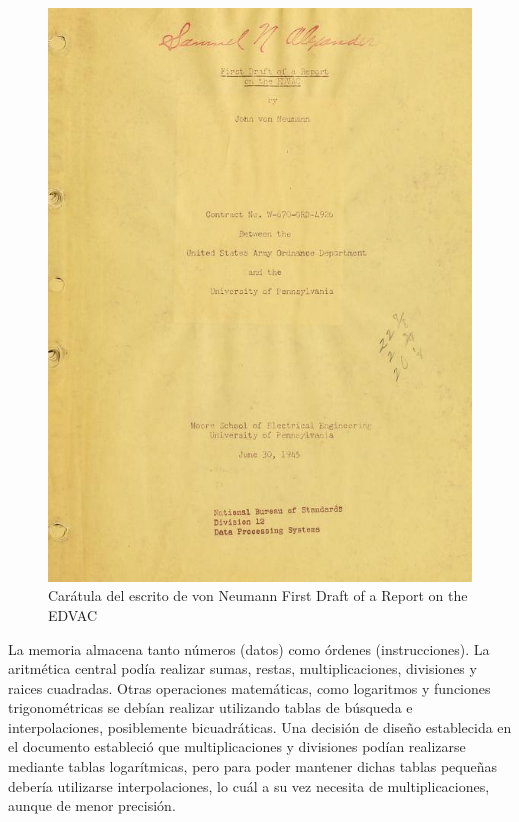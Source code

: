 \begin{figure}
  \centering
  \includegraphics[scale=0.25]{./figures/C02-von_neumann_first_draft}
  \captionsetup{justification=centering}
  \caption{Carátula del escrito de von Neumann First Draft of a Report on the EDVAC}
  \label{fig:C02-von_neumann_first_draft}
\end{figure}
La memoria almacena tanto números (datos) como órdenes (instrucciones).
La aritmética central podía realizar sumas, restas, multiplicaciones, divisiones y raices cuadradas. Otras operaciones matemáticas, como logaritmos y funciones trigonométricas se debían realizar utilizando tablas de búsqueda e interpolaciones, posiblemente bicuadráticas. Una decisión de diseño establecida en el documento estableció que multiplicaciones y divisiones podían realizarse mediante tablas logarítmicas, pero para poder mantener dichas tablas pequeñas debería utilizarse interpolaciones, lo cuál a su vez necesita de multiplicaciones, aunque de menor precisión.\\
